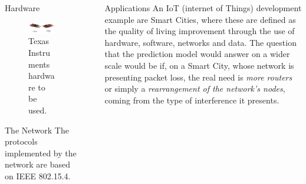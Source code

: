 \documentclass[final]{beamer}
\newlength{\sepwidthB}
\newlength{\colwidthB}
\newcommand{\separatorcolumnB}{\begin{column}{\sepwidthB}\end{column}}
\begin{document}
\begin{frame}[t]
\begin{columns}
\begin{column}[T]{\colwidthB}
\begin{block}{Hardware}
        \begin{figure}[!Ht]
            \centering
                \includegraphics[width=\linewidth]{Figures/hardware.png}
                \caption{Texas Instruments hardware to be used.}
                \label{fig:hw}
        \end{figure}
    \end{block}

    \begin{alertblock}{The Network}
        The protocols implemented by the network are based on IEEE 802.15.4.
    \end{alertblock}
        
\end{column}
\separatorcolumnB
\begin{column}[T]{\colwidthB}

    \begin{block}{Applications}
    An IoT (internet of Things) development example are Smart Cities, where these are defined as the quality of living improvement through the use of hardware, software, networks and data. The question that the prediction model would answer on a wider scale would be if, on a Smart City, whose network is presenting packet loss, the real need is \textit{more routers} or simply a \textit{rearrangement of the network's nodes}, coming from the type of interference it presents.


\end{block}
\end{column}
\end{columns}
\end{frame}
\end{document}
